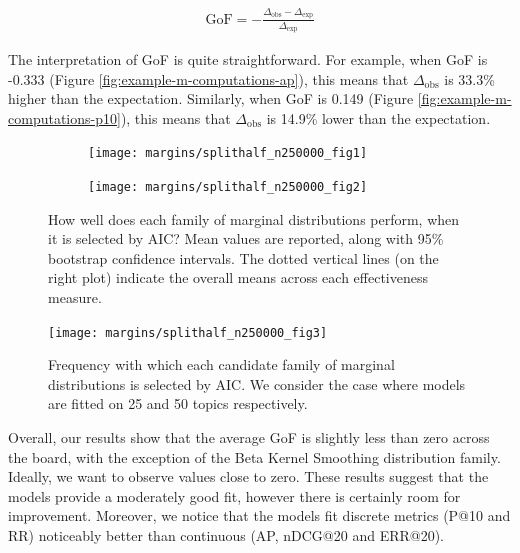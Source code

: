 \begin{eqnarray}\label{eq:gof}
	\text{GoF} = -\frac{\Delta_\text{obs} - \Delta_\text{exp}}{\Delta_\text{exp}}    	
\end{eqnarray}

The interpretation of GoF is quite straightforward. For example, when GoF is -0.333 (Figure \ref{fig:example-m-computations-ap}), this means that $\Delta_\text{obs}$ is 33.3\% higher than the expectation. Similarly, when GoF is 0.149 (Figure \ref{fig:example-m-computations-p10}), this means that $\Delta_\text{obs}$ is 14.9\% lower than the expectation.

\begin{figure}[t]
	\centering	
	\begin{subfigure}[t]{.45\textwidth}
		\centering
		\texttt{[image: margins/splithalf\_n250000\_fig1]}
	\end{subfigure}%
	\begin{subfigure}[t]{.45\textwidth}
		\centering
		\texttt{[image: margins/splithalf\_n250000\_fig2]}
	\end{subfigure}
	\caption{How well does each family of marginal distributions perform, when it is selected by AIC? Mean values are reported, along with 95\% bootstrap confidence intervals. The dotted vertical lines (on the right plot) indicate the overall means across each effectiveness measure.}
	\label{fig:margins-splithalf-plot-1&2}
\end{figure}

\begin{figure}[!t]
	\centering	
	\texttt{[image: margins/splithalf\_n250000\_fig3]}
	\caption{Frequency with which each candidate family of marginal distributions is selected by AIC. We consider the case where models are fitted on 25 and 50 topics respectively.}
	\label{fig:margins-splithalf-plot-3}
\end{figure}

Overall, our results show that the average GoF is slightly less than zero across the board, with the exception of the Beta Kernel Smoothing distribution family. Ideally, we want to observe values close to zero. These results suggest that the models provide a moderately good fit, however there is certainly room for improvement. Moreover, we notice that the models fit discrete metrics (P@10 and RR) noticeably better than continuous (AP, nDCG@20 and ERR@20).

